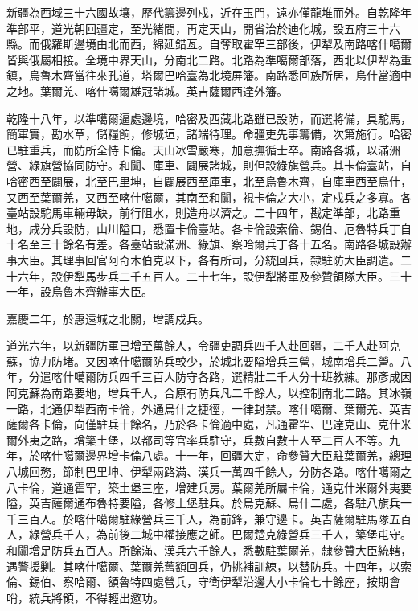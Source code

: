 \begin{pinyinscope}
新疆為西域三十六國故壤，歷代籌邊列戍，近在玉門，遠亦僅龍堆而外。自乾隆年準部平，道光朝回疆定，至光緒間，再定天山，開省治於迪化城，設五府三十六縣。而俄羅斯邊境由北而西，綿延錯亙。自奪取霍罕三部後，伊犁及南路喀什噶爾皆與俄屬相接。全境中界天山，分南北二路。北路為準噶爾部落，西北以伊犁為重鎮，烏魯木齊當往來孔道，塔爾巴哈臺為北境屏籓。南路悉回族所居，烏什當適中之地。葉爾羌、喀什噶爾雄冠諸城。英吉薩爾西達外籓。

乾隆十八年，以準噶爾逼處邊境，哈密及西藏北路雖已設防，而選將備，具駝馬，簡軍實，勘水草，儲糧餉，修城垣，諸端待理。命疆吏先事籌備，次第施行。哈密已駐重兵，而防所全恃卡倫。天山冰雪嚴寒，加意撫循士卒。南路各城，以滿洲營、綠旗營協同防守。和闐、庫車、闢展諸城，則但設綠旗營兵。其卡倫臺站，自哈密西至闢展，北至巴里坤，自闢展西至庫車，北至烏魯木齊，自庫車西至烏什，又西至葉爾羌，又西至喀什噶爾，其南至和闐，視卡倫之大小，定戍兵之多寡。各臺站設駝馬車輛毋缺，前行阻水，則造舟以濟之。二十四年，戡定準部，北路重地，咸分兵設防，山川隘口，悉置卡倫臺站。各卡倫設索倫、錫伯、厄魯特兵丁自十名至三十餘名有差。各臺站設滿洲、綠旗、察哈爾兵丁各十五名。南路各城設辦事大臣。其理事回官阿奇木伯克以下，各有所司，分統回兵，隸駐防大臣調遣。二十六年，設伊犁馬步兵二千五百人。二十七年，設伊犁將軍及參贊領隊大臣。三十一年，設烏魯木齊辦事大臣。

嘉慶二年，於惠遠城之北關，增調戍兵。

道光六年，以新疆防軍已增至萬餘人，令疆吏調兵四千人赴回疆，二千人赴阿克蘇，協力防堵。又因喀什噶爾防兵較少，於城北要隘增兵三營，城南增兵二營。八年，分遣喀什噶爾防兵四千三百人防守各路，選精壯二千人分十班教練。那彥成因阿克蘇為南路要地，增兵千人，合原有防兵凡二千餘人，以控制南北二路。其冰嶺一路，北通伊犁西南卡倫，外通烏什之捷徑，一律封禁。喀什噶爾、葉爾羌、英吉薩爾各卡倫，向僅駐兵十餘名，乃於各卡倫適中處，凡通霍罕、巴達克山、克什米爾外夷之路，增築土堡，以都司等官率兵駐守，兵數自數十人至二百人不等。九年，於喀什噶爾邊界增卡倫八處。十一年，回疆大定，命參贊大臣駐葉爾羌，總理八城回務，節制巴里坤、伊犁兩路滿、漢兵一萬四千餘人，分防各路。喀什噶爾之八卡倫，道通霍罕，築土堡三座，增建兵房。葉爾羌所屬卡倫，通克什米爾外夷要隘，英吉薩爾通布魯特要隘，各修土堡駐兵。於烏克蘇、烏什二處，各駐八旗兵一千三百人。於喀什噶爾駐綠營兵三千人，為前鋒，兼守邊卡。英吉薩爾駐馬隊五百人，綠營兵千人，為前後二城中權接應之師。巴爾楚克綠營兵三千人，築堡屯守。和闐增足防兵五百人。所餘滿、漢兵六千餘人，悉數駐葉爾羌，隸參贊大臣統轄，遇警援剿。其喀什噶爾、葉爾羌舊額回兵，仍挑補訓練，以替防兵。十四年，以索倫、錫伯、察哈爾、額魯特四處營兵，守衛伊犁沿邊大小卡倫七十餘座，按期會哨，統兵將領，不得輕出邀功。


\end{pinyinscope}
